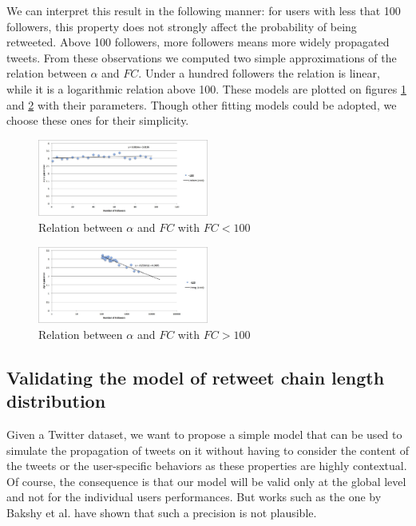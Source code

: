 \documentclass[conference]{IEEEtran}
\begin{document}
We can interpret this result in the following manner: for users with less that 100 followers, this property does not strongly affect the probability of being retweeted. Above 100 followers, more followers means more widely propagated tweets.
From these observations we computed two simple approximations of the relation between $\alpha$ and $FC$. Under a hundred followers the relation is linear, while it is a logarithmic relation above 100. These models are plotted on figures \ref{fig:relationAlphaFVinf} and \ref{fig:relationAlphaFVsup} with their parameters. Though other fitting models could be adopted, we choose these ones for their simplicity.

  \begin{figure}[h]
\includegraphics[width=0.5\textwidth]{data/approximationInf100.jpg}
\caption{Relation between $\alpha$ and $FC$ with $FC<100$}

    \label{fig:relationAlphaFVinf}
\end{figure}

  \begin{figure}[h]
\includegraphics[width=0.5\textwidth]{data/approximationSup100.jpg}
\caption{Relation between $\alpha$ and $FC$ with $FC>100$}

    \label{fig:relationAlphaFVsup}
\end{figure}

\subsection{Validating the model of retweet chain length distribution}

Given a Twitter dataset, we want to propose a simple model that can be used to simulate the propagation of tweets on it without having to consider the content of the tweets or the user-specific behaviors as these properties are highly contextual. Of course, the consequence is that our model will be valid only at the global level and not for the individual users performances. But works such as the one by Bakshy et al.\cite{bakshy2011everyone} have shown that such a precision is not plausible.
\end{document}
